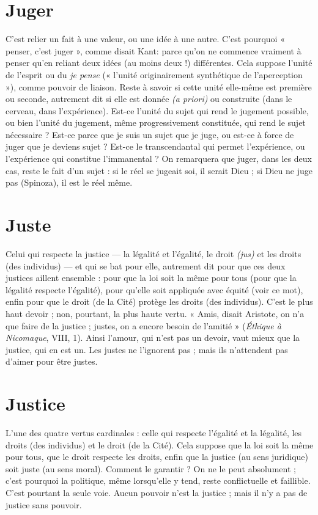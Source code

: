 {\section{Juger}
C’est relier un fait à une valeur, ou une idée à une autre. C’est pourquoi
« penser, c’est juger », comme disait Kant: parce qu'on ne
commence vraiment à penser qu’en reliant deux idées (au moins deux !) différentes.
Cela suppose l’unité de l'esprit ou du {\it je pense} (« l'unité originairement
synthétique de l’aperception »), comme pouvoir de liaison. Reste à savoir si
cette unité elle-même est première ou seconde, autrement dit si elle est donnée
{\it (a priori)} ou construite (dans le cerveau, dans l'expérience). Est-ce l'unité du
sujet qui rend le jugement possible, ou bien l’unité du jugement, même progressivement
constituée, qui rend le sujet nécessaire ? Est-ce parce que je suis
un sujet que je juge, ou est-ce à force de juger que je deviens sujet ? Est-ce le
transcendantal qui permet l’expérience, ou l'expérience qui constitue
l’immanental ? On remarquera que juger, dans les deux cas, reste le fait d’un
sujet : si le réel se jugeait soi, il serait Dieu ; si Dieu ne juge pas (Spinoza), il est
le réel même.

\section{Juste}
Celui qui respecte la justice — la légalité et l'égalité, le droit {\it (jus)} et
les droits (des individus) — et qui se bat pour elle, autrement dit pour
que ces deux justices aillent ensemble : pour que la loi soit la même pour tous
(pour que la légalité respecte l'égalité), pour qu’elle soit appliquée avec équité
(voir ce mot), enfin pour que le droit (de la Cité) protège les droits (des individus).
C’est le plus haut devoir ; non, pourtant, la plus haute vertu. « Amis,
disait Aristote, on n’a que faire de la justice ; justes, on a encore besoin de
l'amitié » ({\it Éthique à Nicomaque}, VIII, 1). Ainsi l'amour, qui n’est pas un
devoir, vaut mieux que la justice, qui en est un. Les justes ne l’ignorent pas ;
mais ils n’attendent pas d’aimer pour être justes.

\section{Justice}
L'une des quatre vertus cardinales : celle qui respecte l'égalité et la
légalité, les droits (des individus) et le droit (de la Cité). Cela suppose
que la loi soit la même pour tous, que le droit respecte les droits, enfin que
la justice (au sens juridique) soit juste (au sens moral). Comment le garantir ?
On ne le peut absolument ; c’est pourquoi la politique, même lorsqu’elle y
tend, reste conflictuelle et faillible. C’est pourtant la seule voie. Aucun pouvoir
n’est la justice ; mais il n’y a pas de justice sans pouvoir.

}
